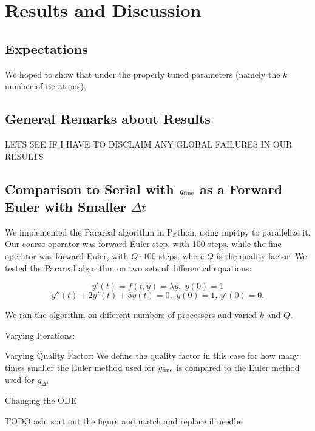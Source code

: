 \documentclass[letterpaper,12pt]{article}
\begin{document}
\section{Results and Discussion}

\subsection{Expectations}
We hoped to show that under the properly tuned parameters (namely the $k$ number of iterations),

\subsection{General Remarks about Results}
LETS SEE IF I HAVE TO DISCLAIM ANY GLOBAL FAILURES IN OUR RESULTS

\subsection{Comparison to Serial with $g_{\textnormal{fine}}$ as a Forward Euler with
Smaller $\Delta t$}

We implemented the Parareal algorithm in Python, using mpi4py to parallelize it.
Our coarse operator was forward Euler step, with 100 steps, while the fine
operator was forward Euler, with $Q \cdot 100$ steps, where $Q$ is the quality
factor. We tested the Parareal algorithm on two sets of differential equations:

\[
y'(t) = f(t, y) = \lambda y, \, \, y(0) = 1
\]
\[
y''(t) + 2y'(t) + 5y(t) = 0, \, \, y(0) = 1, \, y'(0) = 0.
\]

We ran the algorithm on different numbers of processors and varied $k$ and $Q$. 

Varying Iterations:

Varying Quality Factor:
We define the quality factor in this case for how many times smaller the Euler method used for $g_{\textnormal{fine}}$ is compared to the Euler method used for $g_{\Delta t}$

Changing the ODE

TODO ashi sort out the figure and match and replace if needbe
\end{document}
